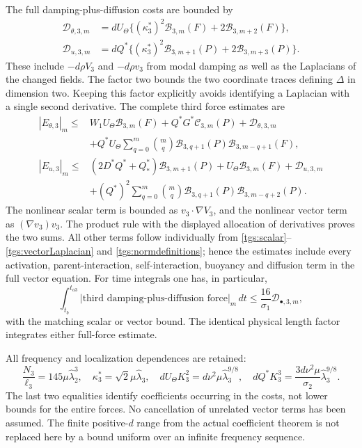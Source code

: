 The full damping-plus-diffusion costs are bounded by
\begin{align}
 \mathcal D_{\theta,3,m}
 &=dU_\Theta\{(\kappa_3^*)^2\mathcal B_{3,m}(F)
                              +2\mathcal B_{3,m+2}(F)\},\nonumber\\
 \mathcal D_{u,3,m}
 &=dQ^*\{(\kappa_3^*)^2\mathcal B_{3,m+1}(P)
                              +2\mathcal B_{3,m+3}(P)\}.
 \label{tgs:diffusioncosts}
\end{align}
These include $-d\rho V_3$ and $-d\rho v_3$ from modal
damping as well as the Laplacians of the changed fields.
The factor two bounds the two coordinate traces defining
$\Delta$ in dimension two. Keeping this factor explicitly avoids
identifying a Laplacian with a single second derivative.
The complete third force estimates are
\begin{align}
 |E_{\theta,3}|_m\leq{}&W_1U_\Theta\mathcal B_{3,m}(F)
           +Q^*G^*\mathcal C_{3,m}(P)+\mathcal D_{\theta,3,m}
 \nonumber\\
 &+Q^*U_\Theta\sum_{q=0}^m\binom mq
       \mathcal B_{3,q+1}(P)\mathcal B_{3,m-q+1}(F),
 \label{tgs:scalarcost}\\
 |E_{u,3}|_m\leq{}&(2D^*Q^*+Q_*^*)\mathcal B_{3,m+1}(P)
           +U_\Theta\mathcal B_{3,m}(F)+\mathcal D_{u,3,m}
 \nonumber\\
 &+(Q^*)^2\sum_{q=0}^m\binom mq
       \mathcal B_{3,q+1}(P)\mathcal B_{3,m-q+2}(P).
 \label{tgs:vectorcost}
\end{align}
The nonlinear scalar term is bounded as $v_3\cdot\nabla V_3$,
and the nonlinear vector term as $(\nabla v_3)v_3$.
The product rule with the displayed allocation of derivatives
proves the two sums. All other terms follow individually from
\eqref{tgs:scalar}--\eqref{tgs:vectorLaplacian} and
\eqref{tgs:normdefinitions}; hence the estimates include every
activation, parent-interaction, self-interaction, buoyancy and
diffusion term in the full vector equation.
For time integrals one has, in particular,
\begin{equation}\label{tgs:integratedcost}
 \int_{t_b}^{t_{a3}}|\text{third damping-plus-diffusion force}|_m\,dt
 \leq\frac{16}{\sigma_1}\mathcal D_{\bullet,3,m},
\end{equation}
with the matching scalar or vector bound. The identical physical
length factor integrates either full-force estimate.

All frequency and localization dependences are retained:
\begin{equation}\label{tgs:frequencycost}
 \frac{N_3}{\ell_3}=145\mu\widehat\lambda_2^3,
 \quad\kappa_3^*=\sqrt2\mu\widehat\lambda_3,
 \quad dU_\Theta K_3^2=d\nu^2\mu\widehat\lambda_3^{9/8},
 \quad dQ^*K_3^3=\frac{3d\nu^2\mu}{\sigma_2}
                      \widehat\lambda_3^{9/8}.
\end{equation}
The last two equalities identify coefficients occurring in the
costs, not lower bounds for the entire forces. No cancellation of
unrelated vector terms has been assumed. The finite positive-$d$
range from the actual coefficient theorem is not replaced here by
a bound uniform over an infinite frequency sequence.

